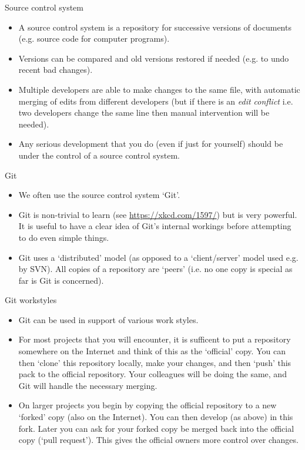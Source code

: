 \documentclass{beamer}
\begin{document}
\begin{frame}{Source control system}
  \begin{itemize}
    \item A source control system is a repository for successive versions of documents (e.g. source code for computer programs).
    \item Versions can be compared and old versions restored if needed (e.g. to undo recent bad changes).
    \item Multiple developers are able to make changes to the same file, with automatic merging of edits from different developers (but if there is an \textit{edit conflict} i.e. two developers change the same line then manual intervention will be needed).
    \item Any serious development that you do (even if just for yourself) should be under the control of a source control system.
  \end{itemize}
\end{frame}
    
\begin{frame}{Git}
  \begin{itemize}
    \item We often use the source control system `Git'.
    \item Git is non-trivial to learn (see \url{https://xkcd.com/1597/}) but is very powerful. It is useful to have a clear idea of Git's internal workings before attempting to do even simple things.
    \item Git uses a `distributed' model (as opposed to a `client/server' model used e.g. by SVN). All copies of a repository are `peers' (i.e. no one copy is special as far is Git is concerned).
  \end{itemize}
\end{frame}

\begin{frame}{Git workstyles}
  \begin{itemize}
    \item Git can be used in support of various work styles.
    \item For most projects that you will encounter, it is sufficent to put a repository somewhere on the Internet and think of this as the  `official' copy. You can then `clone' this repository locally, make your changes, and then `push' this pack to the official repository. Your colleagues will be doing the same, and Git will handle the necessary merging.
    \item On larger projects you begin by copying the official repository to a new `forked' copy (also on the Internet). You can then develop (as above) in this fork. Later you can ask for your forked copy be merged back into the official copy (`pull request'). This gives the official owners more control over changes.
  \end{itemize}
\end{frame}
\end{document}
